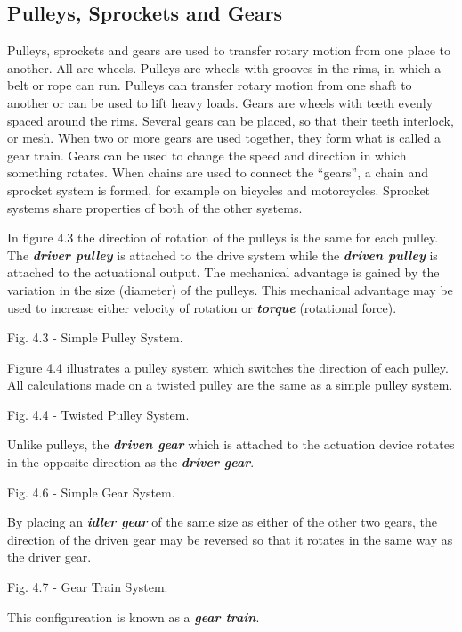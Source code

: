 \documentclass[
]{book}
\begin{document}
\hypertarget{pulleys-sprockets-and-gears}{%
\subsection{Pulleys, Sprockets and Gears}\label{pulleys-sprockets-and-gears}}

Pulleys, sprockets and gears are used to transfer rotary motion from one place to another. All are wheels. Pulleys are wheels with grooves in the rims, in which a belt or rope can run. Pulleys can transfer rotary motion from one shaft to another or can be used to lift heavy loads. Gears are wheels with teeth evenly spaced around the rims. Several gears can be placed, so that their teeth interlock, or mesh. When two or more gears are used together, they form what is called a gear train. Gears can be used to change the speed and direction in which something rotates. When chains are used to connect the ``gears'', a chain and sprocket system is formed, for example on bicycles and motorcycles. Sprocket systems share properties of both of the other systems.

In figure 4.3 the direction of rotation of the pulleys is the same for each pulley. The \textbf{\emph{driver pulley}} is attached to the drive system while the \textbf{\emph{driven pulley}} is attached to the actuational output. The mechanical advantage is gained by the variation in the size (diameter) of the pulleys. This mechanical advantage may be used to increase either velocity of rotation or \textbf{\emph{torque}} (rotational force).

Fig. 4.3 - Simple Pulley System.

Figure 4.4 illustrates a pulley system which switches the direction of each pulley. All calculations made on a twisted pulley are the same as a simple pulley system.

Fig. 4.4 - Twisted Pulley System.

Unlike pulleys, the \textbf{\emph{driven gear}} which is attached to the actuation device rotates in the opposite direction as the \textbf{\emph{driver gear}}.

Fig. 4.6 - Simple Gear System.

By placing an \textbf{\emph{idler gear}} of the same size as either of the other two gears, the direction of the driven gear may be reversed so that it rotates in the same way as the driver gear.

Fig. 4.7 - Gear Train System.

This configureation is known as a \textbf{\emph{gear train}}.
\end{document}
